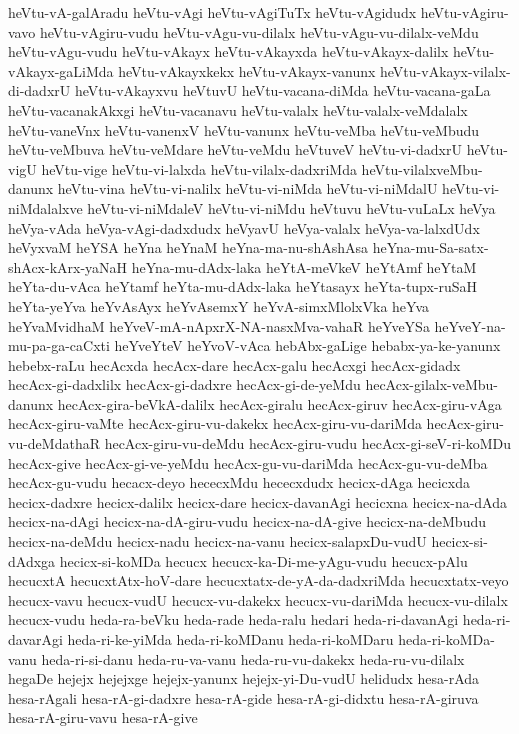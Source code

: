 {heVtu-vA-galAradu
heVtu-vAgi
heVtu-vAgiTuTx
heVtu-vAgidudx
heVtu-vAgiru-vavo
heVtu-vAgiru-vudu
heVtu-vAgu-vu-dilalx
heVtu-vAgu-vu-dilalx-veMdu
heVtu-vAgu-vudu
heVtu-vAkayx
heVtu-vAkayxda
heVtu-vAkayx-dalilx
heVtu-vAkayx-gaLiMda
heVtu-vAkayxkekx
heVtu-vAkayx-vanunx
heVtu-vAkayx-vilalx-di-dadxrU
heVtu-vAkayxvu
heVtuvU
heVtu-vacana-diMda
heVtu-vacana-gaLa
heVtu-vacanakAkxgi
heVtu-vacanavu
heVtu-valalx
heVtu-valalx-veMdalalx
heVtu-vaneVnx
heVtu-vanenxV
heVtu-vanunx
heVtu-veMba
heVtu-veMbudu
heVtu-veMbuva
heVtu-veMdare
heVtu-veMdu
heVtuveV
heVtu-vi-dadxrU
heVtu-vigU
heVtu-vige
heVtu-vi-lalxda
heVtu-vilalx-dadxriMda
heVtu-vilalxveMbu-danunx
heVtu-vina
heVtu-vi-nalilx
heVtu-vi-niMda
heVtu-vi-niMdalU
heVtu-vi-niMdalalxve
heVtu-vi-niMdaleV
heVtu-vi-niMdu
heVtuvu
heVtu-vuLaLx
heVya
heVya-vAda
heVya-vAgi-dadxdudx
heVyavU
heVya-valalx
heVya-va-lalxdUdx
heVyxvaM
heYSA
heYna
heYnaM
heYna-ma-nu-shAshAsa
heYna-mu-Sa-satx-shAcx-kArx-yaNaH
heYna-mu-dAdx-laka
heYtA-meVkeV
heYtAmf
heYtaM
heYta-du-vAca
heYtamf
heYta-mu-dAdx-laka
heYtasayx
heYta-tupx-ruSaH
heYta-yeYva
heYvAsAyx
heYvAsemxY
heYvA-simxMlolxVka
heYva
heYvaMvidhaM
heYveV-mA-nApxrX-NA-nasxMva-vahaR
heYveYSa
heYveY-na-mu-pa-ga-caCxti
heYveYteV
heYvoV-vAca
hebAbx-gaLige
hebabx-ya-ke-yanunx
hebebx-raLu
hecAcxda
hecAcx-dare
hecAcx-galu
hecAcxgi
hecAcx-gidadx
hecAcx-gi-dadxlilx
hecAcx-gi-dadxre
hecAcx-gi-de-yeMdu
hecAcx-gilalx-veMbu-danunx
hecAcx-gira-beVkA-dalilx
hecAcx-giralu
hecAcx-giruv
hecAcx-giru-vAga
hecAcx-giru-vaMte
hecAcx-giru-vu-dakekx
hecAcx-giru-vu-dariMda
hecAcx-giru-vu-deMdathaR
hecAcx-giru-vu-deMdu
hecAcx-giru-vudu
hecAcx-gi-seV-ri-koMDu
hecAcx-give
hecAcx-gi-ve-yeMdu
hecAcx-gu-vu-dariMda
hecAcx-gu-vu-deMba
hecAcx-gu-vudu
hecacx-deyo
hececxMdu
hececxdudx
hecicx-dAga
hecicxda
hecicx-dadxre
hecicx-dalilx
hecicx-dare
hecicx-davanAgi
hecicxna
hecicx-na-dAda
hecicx-na-dAgi
hecicx-na-dA-giru-vudu
hecicx-na-dA-give
hecicx-na-deMbudu
hecicx-na-deMdu
hecicx-nadu
hecicx-na-vanu
hecicx-salapxDu-vudU
hecicx-si-dAdxga
hecicx-si-koMDa
hecucx
hecucx-ka-Di-me-yAgu-vudu
hecucx-pAlu
hecucxtA
hecucxtAtx-hoV-dare
hecucxtatx-de-yA-da-dadxriMda
hecucxtatx-veyo
hecucx-vavu
hecucx-vudU
hecucx-vu-dakekx
hecucx-vu-dariMda
hecucx-vu-dilalx
hecucx-vudu
heda-ra-beVku
heda-rade
heda-ralu
hedari
heda-ri-davanAgi
heda-ri-davarAgi
heda-ri-ke-yiMda
heda-ri-koMDanu
heda-ri-koMDaru
heda-ri-koMDa-vanu
heda-ri-si-danu
heda-ru-va-vanu
heda-ru-vu-dakekx
heda-ru-vu-dilalx
hegaDe
hejejx
hejejxge
hejejx-yanunx
hejejx-yi-Du-vudU
helidudx
hesa-rAda
hesa-rAgali
hesa-rA-gi-dadxre
hesa-rA-gide
hesa-rA-gi-didxtu
hesa-rA-giruva
hesa-rA-giru-vavu
hesa-rA-give
}
